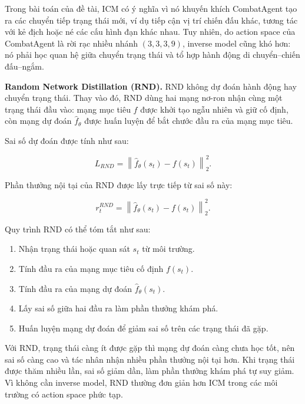 Trong bài toán của đề tài, ICM có ý nghĩa vì nó khuyến khích CombatAgent tạo ra các chuyển tiếp trạng thái mới, ví dụ tiếp cận vị trí chiến đấu khác, tương tác với kẻ địch hoặc né các cấu hình đạn khác nhau. Tuy nhiên, do action space của CombatAgent là rời rạc nhiều nhánh $(3,3,3,9)$, inverse model cũng khó hơn: nó phải học quan hệ giữa chuyển trạng thái và tổ hợp hành động di chuyển--chiến đấu--ngắm.

\textbf{Random Network Distillation (RND).}
RND không dự đoán hành động hay chuyển trạng thái. Thay vào đó, RND dùng hai mạng nơ-ron nhận cùng một trạng thái đầu vào: mạng mục tiêu $f$ được khởi tạo ngẫu nhiên và giữ cố định, còn mạng dự đoán $\hat{f}_{\theta}$ được huấn luyện để bắt chước đầu ra của mạng mục tiêu.

Sai số dự đoán được tính như sau:

\begin{equation}
    L_{RND} =
    \left\|
    \hat{f}_{\theta}(s_t) - f(s_t)
    \right\|_2^2.
\end{equation}

Phần thưởng nội tại của RND được lấy trực tiếp từ sai số này:

\begin{equation}
    r_t^{RND} =
    \left\|
    \hat{f}_{\theta}(s_t) - f(s_t)
    \right\|_2^2.
\end{equation}

Quy trình RND có thể tóm tắt như sau:

\begin{enumerate}
    \item Nhận trạng thái hoặc quan sát $s_t$ từ môi trường.
    \item Tính đầu ra của mạng mục tiêu cố định $f(s_t)$.
    \item Tính đầu ra của mạng dự đoán $\hat{f}_{\theta}(s_t)$.
    \item Lấy sai số giữa hai đầu ra làm phần thưởng khám phá.
    \item Huấn luyện mạng dự đoán để giảm sai số trên các trạng thái đã gặp.
\end{enumerate}

Với RND, trạng thái càng ít được gặp thì mạng dự đoán càng chưa học tốt, nên sai số càng cao và tác nhân nhận nhiều phần thưởng nội tại hơn. Khi trạng thái được thăm nhiều lần, sai số giảm dần, làm phần thưởng khám phá tự suy giảm. Vì không cần inverse model, RND thường đơn giản hơn ICM trong các môi trường có action space phức tạp.

